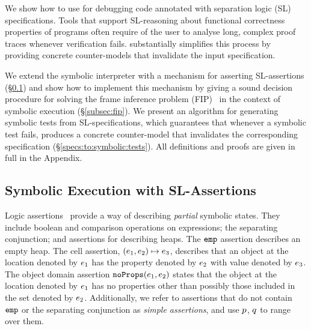 

\noindent We show how to use \cosette for debugging \jsil code annotated with 
separation logic (SL) specifications. Tools that support SL-reasoning about
functional correctness properties of programs often require of the user to 
analyse long, complex proof traces whenever
verification fails. 
\cosette substantially simplifies this process by providing
concrete counter-models that invalidate the input specification. 


We extend the 
 \jsil symbolic interpreter with a mechanism for asserting
SL-assertions (\S\ref{subsec:sep:assertions}) and show how to 
implement this mechanism by giving a sound decision procedure 
for solving the frame inference problem (FIP)~\cite{}
in the context of symbolic execution (\S\ref{subsec:fip}).
%
%
We present an algorithm  
for generating symbolic tests from SL-specifications, which guarantees 
that whenever a symbolic test fails, \cosette produces a concrete 
counter-model that invalidates the corresponding specification (\S\ref{specs:to:symbolic:tests}). 
All definitions and proofs are given in full in the Appendix.

\vspace{-5pt}
\subsection{Symbolic Execution with SL-Assertions}\label{subsec:sep:assertions}

\jsil Logic assertions~\cite{javert} provide a way of describing \emph{partial} symbolic states.
They include boolean and comparison operations on \jsil expressions; the separating conjunction; 
and assertions for describing heaps. The $\texttt{emp}$ assertion describes 
an empty heap. The cell assertion, $(e_1,e_2) \mapsto e_3$,  describes that an object 
at the location denoted by $e_1$ has the property denoted by $e_2$ with value 
denoted by $e_3$. The object domain assertion $\texttt{noProps}(e_1, e_2)$ states that the object at 
the location denoted by $e_1$ has no properties other than possibly those included in the
set denoted by $e_2$. Additionally, we refer to assertions that do not contain $\texttt{emp}$ or 
the separating conjunction as \emph{simple assertions}, and use $p$, $q$ 
to range over them.

